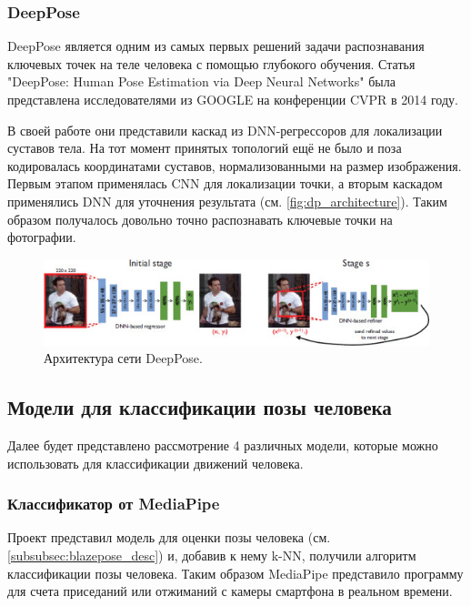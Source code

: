 \subsubsection{DeepPose}
\label{subsubsec:deeppose_desc}

DeepPose является одним из самых первых решений задачи распознавания ключевых точек на теле человека с помощью глубокого обучения. Статья "DeepPose: Human Pose Estimation via Deep Neural Networks"{} \cite{DeepPose} была представлена исследователями из GOOGLE на конференции CVPR в 2014 году.

В своей работе они представили каскад из DNN-регрессоров для локализации суставов тела. На тот момент принятых топологий ещё не было и поза кодировалась координатами суставов, нормализованными на размер изображения.
Первым этапом применялась CNN для локализации точки, а вторым каскадом применялись DNN для уточнения результата (см. \autoref{fig:dp_architecture}). Таким образом получалось довольно точно распознавать ключевые точки на фотографии.

\begin{figure}[h]
	\centering
	\includegraphics[width=\textwidth]{./images/DeepPose}
	\caption{Архитектура сети DeepPose. \cite{DeepPose}}
	\label{fig:dp_architecture}
\end{figure}
\hfill \break






\subsection{Модели для классификации позы человека}
\label{subsec:pose_classification_models}

Далее будет представлено рассмотрение 4 различных модели, которые можно использовать для классификации движений человека.



\subsubsection{Классификатор от MediaPipe}
\label{subsubsec:mp_classificator_desc}

Проект представил модель для оценки позы человека (см. \autoref{subsubsec:blazepose_desc}) и, добавив к нему k-NN, получили алгоритм классификации позы человека. Таким образом MediaPipe представило программу для счета приседаний или отжиманий с камеры смартфона в реальном времени. \cite{mediapipe_cls}

